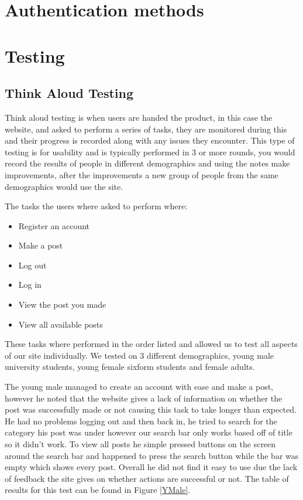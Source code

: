 \documentclass{cmpstyle}
\begin{document}
\section{Authentication methods}	
	
\section{Testing}
\subsection{Think Aloud Testing}
Think aloud testing is when users are handed the product, in this case the website, and asked to perform a series of tasks, they are monitored during this and their progress is recorded along with any issues they encounter. This type of testing is for usability and is typically performed in 3 or more rounds, you would record the results of people in different demographics and using the notes make improvements, after the improvements a new group of people from the same demographics would use the site.

The tasks the users where asked to perform where:
\begin{itemize}
	\item Register an account
	\item Make a post
	\item Log out
	\item Log in
	\item View the post you made
	\item View all available posts
\end{itemize}
These tasks where performed in the order listed and allowed us to test all aspects of our site individually. We tested on 3 different demographics, young male university students, young female sixform students and female adults. 

The young male managed to create an account with ease and make a post, however he noted that the website gives a lack of information on whether the post was successfully made or not causing this task to take longer than expected. He had no problems logging out and then back in, he tried to search for the category his post was under however our search bar only works based off of title so it didn't work. To view all posts he simple pressed buttons on the screen around the search bar and happened to press the search button while the bar was empty which shows every post. Overall he did not find it easy to use due the lack of feedback the site gives on whether actions are successful or not. The table of results for this test can be found in Figure \ref{YMale}.
\end{document}
